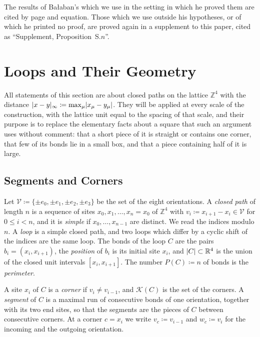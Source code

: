 \documentclass[11pt]{preprint}
\DeclarePairedDelimiter{\abs}{\lvert}{\rvert}
\numberwithin{equation}{section}
\theoremstyle{definition}
\theoremstyle{remark}
\theoremstyle{plain}
\begin{document}
The results of Ba{\l}aban's which we use in the setting in which he proved them are cited by page and equation. Those which we use outside his hypotheses, or of which he printed no proof, are proved again in a supplement to this paper, cited as ``Supplement, Proposition~S.$n$''.

\section{Loops and Their Geometry}\label{sec:loops}

All statements of this section are about closed paths on the lattice $\mathbb Z^4$ with the distance $\abs{x - y}_\infty \coloneqq \max_\mu\abs{x_\mu - y_\mu}$. They will be applied at every scale of the construction, with the lattice unit equal to the spacing of that scale, and their purpose is to replace the elementary facts about a square that such an argument uses without comment: that a short piece of it is straight or contains one corner, that few of its bonds lie in a small box, and that a piece containing half of it is large.

\subsection{Segments and Corners}\label{sec:segments-corners}

Let $\mathcal V \coloneqq \{ \pm e_0, \pm e_1, \pm e_2, \pm e_3 \}$ be the set of the eight orientations. A \emph{closed path} of length $n$ is a sequence of sites $x_0, x_1, \dots, x_n = x_0$ of $\mathbb Z^4$ with $v_i \coloneqq x_{i+1} - x_i \in \mathcal V$ for $0 \leq i < n$, and it is \emph{simple} if $x_0, \dots, x_{n-1}$ are distinct. We read the indices modulo $n$. A \emph{loop} is a simple closed path, and two loops which differ by a cyclic shift of the indices are the same loop. The bonds of the loop $C$ are the pairs $b_i = (x_i, x_{i+1})$, the \emph{position} of $b_i$ is its initial site $x_i$, and $\abs{C} \subset \mathbb R^4$ is the union of the closed unit intervals $[x_i, x_{i+1}]$. The number $P(C) \coloneqq n$ of bonds is the \emph{perimeter}.

A site $x_i$ of $C$ is a \emph{corner} if $v_i \neq v_{i-1}$, and $\mathcal K(C)$ is the set of the corners. A \emph{segment} of $C$ is a maximal run of consecutive bonds of one orientation, together with its two end sites, so that the segments are the pieces of $C$ between consecutive corners. At a corner $c = x_i$ we write $v_c \coloneqq v_{i-1}$ and $w_c \coloneqq v_i$ for the incoming and the outgoing orientation.
\end{document}
